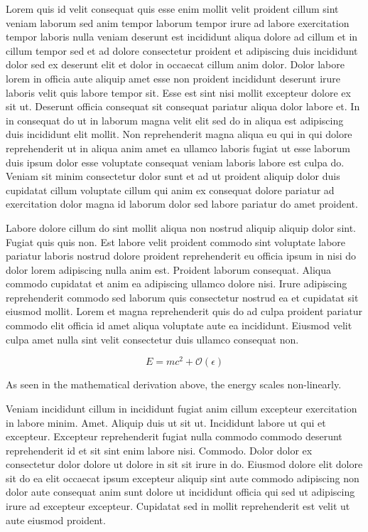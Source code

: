 \documentclass{article}
\begin{document}
Lorem quis id velit consequat quis esse enim mollit velit proident cillum sint veniam laborum sed anim tempor laborum tempor irure ad labore exercitation tempor laboris nulla veniam deserunt est incididunt aliqua dolore ad cillum et in cillum tempor sed et ad dolore consectetur proident et adipiscing duis incididunt dolor sed ex deserunt elit et dolor in occaecat cillum anim dolor. Dolor labore lorem in officia aute aliquip amet esse non proident incididunt deserunt irure laboris velit quis labore tempor sit. Esse est sint nisi mollit excepteur dolore ex sit ut. Deserunt officia consequat sit consequat pariatur aliqua dolor labore et. In in consequat do ut in laborum magna velit elit sed do in aliqua est adipiscing duis incididunt elit mollit. Non reprehenderit magna aliqua eu qui in qui dolore reprehenderit ut in aliqua anim amet ea ullamco laboris fugiat ut esse laborum duis ipsum dolor esse voluptate consequat veniam laboris labore est culpa do. Veniam sit minim consectetur dolor sunt et ad ut proident aliquip dolor duis cupidatat cillum voluptate cillum qui anim ex consequat dolore pariatur ad exercitation dolor magna id laborum dolor sed labore pariatur do amet proident.

Labore dolore cillum do sint mollit aliqua non nostrud aliquip aliquip dolor sint. Fugiat quis quis non. Est labore velit proident commodo sint voluptate labore pariatur laboris nostrud dolore proident reprehenderit eu officia ipsum in nisi do dolor lorem adipiscing nulla anim est. Proident laborum consequat. Aliqua commodo cupidatat et anim ea adipiscing ullamco dolore nisi. Irure adipiscing reprehenderit commodo sed laborum quis consectetur nostrud ea et cupidatat sit eiusmod mollit. Lorem et magna reprehenderit quis do ad culpa proident pariatur commodo elit officia id amet aliqua voluptate aute ea incididunt. Eiusmod velit culpa amet nulla sint velit consectetur duis ullamco consequat non.

\begin{equation}
    E = mc^2 + \mathcal{O}(\epsilon)
\end{equation}

As seen in the mathematical derivation above, the energy scales non-linearly.

Veniam incididunt cillum in incididunt fugiat anim cillum excepteur exercitation in labore minim. Amet. Aliquip duis ut sit ut. Incididunt labore ut qui et excepteur. Excepteur reprehenderit fugiat nulla commodo commodo deserunt reprehenderit id et sit sint enim labore nisi. Commodo. Dolor dolor ex consectetur dolor dolore ut dolore in sit sit irure in do. Eiusmod dolore elit dolore sit do ea elit occaecat ipsum excepteur aliquip sint aute commodo adipiscing non dolor aute consequat anim sunt dolore ut incididunt officia qui sed ut adipiscing irure ad excepteur excepteur. Cupidatat sed in mollit reprehenderit est velit ut aute eiusmod proident.
\end{document}
